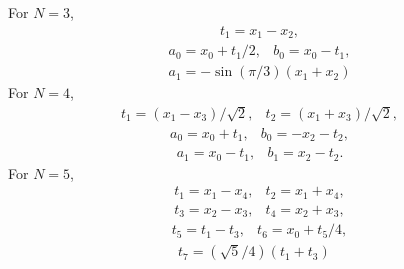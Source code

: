\documentclass[fleqn,12pt]{article}
\begin{document}
%
For $N=3$,
%
\begin{equation}
\begin{array}{l}
t_1 = x_1 - x_2,
\end{array}
\end{equation}
\begin{equation}
\begin{array}{ll}
a_0 = x_0 + t_1/2, & b_0 = x_0 - t_1,
\end{array}
\end{equation}
\begin{equation}
\begin{array}{l}
a_1 = - \sin(\pi/3) (x_1 + x_2)
\end{array}
\end{equation}
%
For $N=4$,
%
\begin{equation}
\begin{array}{ll}
t_1 = (x_1 - x_3)/\sqrt{2}, & t_2 = (x_1 + x_3)/\sqrt{2},
\end{array}
\end{equation}
\begin{equation}
\begin{array}{ll}
a_0 = x_0 + t_1, & b_0 = -x_2 - t_2,
\end{array}
\end{equation}
\begin{equation}
\begin{array}{ll}
a_1 = x_0 - t_1, & b_1 = x_2 - t_2.
\end{array}
\end{equation}
%
For $N=5$,
%
\begin{equation}
\begin{array}{ll}
t_1 = x_1 - x_4, & t_2 = x_1 + x_4,
\end{array}
\end{equation}
\begin{equation}
\begin{array}{ll}
t_3 = x_2 - x_3, & t_4 = x_2 + x_3,
\end{array}
\end{equation}
\begin{equation}
\begin{array}{ll}
t_5 = t_1 - t_3, & t_6 = x_0 + t_5 / 4,
\end{array}
\end{equation}
\begin{equation}
\begin{array}{ll}
t_7 = (\sqrt{5}/4)(t_1 + t_3) & 
\end{array}
\end{equation}
\end{document}
